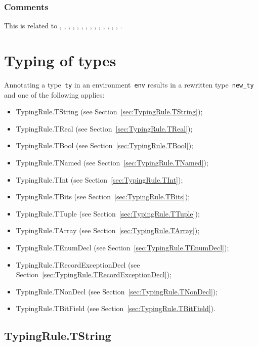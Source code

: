 \documentclass{book}
\begin{document}
\begin{itemize}
\begin{formal}
\end{formal}

\subsection{Comments}
  This is related to , , ,
  , , , , ,
  , , , , ,
  , .

\chapter{Typing of types}

Annotating a type~\texttt{ty} in an environment~\texttt{env} results in a
rewritten type~\texttt{new\_ty} and one of the following applies:
\begin{itemize}
  \item TypingRule.TString (see Section~\ref{sec:TypingRule.TString});
  \item TypingRule.TReal (see Section~\ref{sec:TypingRule.TReal});
  \item TypingRule.TBool (see Section~\ref{sec:TypingRule.TBool});
  \item TypingRule.TNamed (see Section~\ref{sec:TypingRule.TNamed});
  \item TypingRule.TInt (see Section~\ref{sec:TypingRule.TInt});
  \item TypingRule.TBits (see Section~\ref{sec:TypingRule.TBits});
  \item TypingRule.TTuple (see Section~\ref{sec:TypingRule.TTuple});
  \item TypingRule.TArray (see Section~\ref{sec:TypingRule.TArray});
  \item TypingRule.TEnumDecl (see Section~\ref{sec:TypingRule.TEnumDecl});
  \item TypingRule.TRecordExceptionDecl (see
    Section~\ref{sec:TypingRule.TRecordExceptionDecl});
  \item TypingRule.TNonDecl (see Section~\ref{sec:TypingRule.TNonDecl});
  \item TypingRule.TBitField (see Section~\ref{sec:TypingRule.TBitField}).
\end{itemize}


\section{TypingRule.TString \label{sec:TypingRule.TString}}


\end{itemize}
\end{document}
